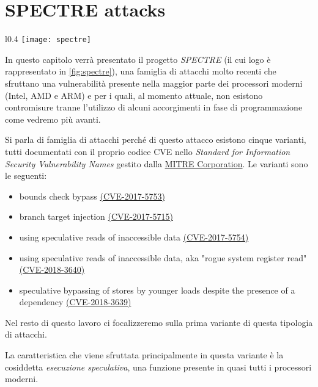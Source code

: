 \chapter{SPECTRE attacks}

	\begin{wrapfigure}{l}{0.4\textwidth}
		\texttt{[image: spectre]}
		\caption{Il logo di SPECTRE}
		\label{fig:spectre}
	\end{wrapfigure}

	In questo capitolo verrà presentato il progetto \emph{SPECTRE}\cite{kocher2018spectre} (il cui logo è rappresentato in \cref{fig:spectre}), una famiglia di attacchi molto recenti che sfruttano una vulnerabilità presente nella maggior parte dei processori moderni (Intel, AMD e ARM) e per i quali, al momento attuale, non esistono contromisure tranne l'utilizzo di alcuni accorgimenti in fase di programmazione come vedremo più avanti.
	
	Si parla di famiglia di attacchi perché di questo attacco esistono cinque varianti, tutti documentati con il proprio codice \ac{CVE} nello \emph{Standard for Information Security Vulnerability Names} gestito dalla \href{https://www.mitre.org/}{MITRE Corporation}. Le varianti sono le seguenti:
	
	\begin{itemize}
		\item [v1:] bounds check bypass \href{https://cve.mitre.org/cgi-bin/cvename.cgi?name=CVE-2017-5753}{(CVE-2017-5753)}
		\item [v2:] branch target injection \href{https://cve.mitre.org/cgi-bin/cvename.cgi?name=CVE-2017-5715}{(CVE-2017-5715)}
		\item [v3:] using speculative reads of inaccessible data \href{https://cve.mitre.org/cgi-bin/cvename.cgi?name=CVE-2017-5754}{(CVE-2017-5754)}
		\item [v3a:] using speculative reads of inaccessible data, aka "rogue system register read" \href{https://cve.mitre.org/cgi-bin/cvename.cgi?name=CVE-2018-3640}{(CVE-2018-3640)}
		\item [v4:] speculative bypassing of stores by younger loads despite the presence of a dependency \href{https://cve.mitre.org/cgi-bin/cvename.cgi?name=CVE-2018-3639}{(CVE-2018-3639)}
	\end{itemize}
	
	Nel resto di questo lavoro ci focalizzeremo sulla prima variante di questa tipologia di attacchi.
	
	La caratteristica che viene sfruttata principalmente in questa variante è la cosiddetta \emph{esecuzione speculativa}, una funzione presente in quasi tutti i processori moderni.
	
